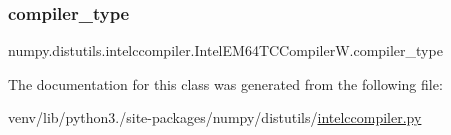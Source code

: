 \subsubsection{\texorpdfstring{compiler\+\_\+type}{compiler\_type}}
{\footnotesize\ttfamily numpy.\+distutils.\+intelccompiler.\+Intel\+E\+M64\+T\+C\+Compiler\+W.\+compiler\+\_\+type\hspace{0.3cm}{\ttfamily [static]}}



The documentation for this class was generated from the following file\+:\begin{DoxyCompactItemize}
\item 
venv/lib/python3./site-\/packages/numpy/distutils/\hyperlink{intelccompiler_8py}{intelccompiler.\+py}\end{DoxyCompactItemize}
